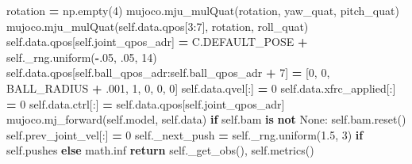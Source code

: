 \documentclass[
  american,
  11pt,
  letterpaper,
]{article}
\newenvironment{Shaded}{\begin{snugshade}}{\end{snugshade}}
\newcommand{\ControlFlowTok}[1]{\textcolor[rgb]{0.13,0.29,0.53}{\textbf{#1}}}
\newcommand{\DecValTok}[1]{\textcolor[rgb]{0.00,0.00,0.81}{#1}}
\newcommand{\FloatTok}[1]{\textcolor[rgb]{0.00,0.00,0.81}{#1}}
\newcommand{\KeywordTok}[1]{\textcolor[rgb]{0.13,0.29,0.53}{\textbf{#1}}}
\newcommand{\NormalTok}[1]{#1}
\newcommand{\OperatorTok}[1]{\textcolor[rgb]{0.81,0.36,0.00}{\textbf{#1}}}
\newcommand{\VariableTok}[1]{\textcolor[rgb]{0.00,0.00,0.00}{#1}}
\renewenvironment{Shaded}{\par\smallskip}{\par\smallskip}
\begin{document}
\begin{Shaded}
\begin{Highlighting}[]
\NormalTok{        rotation }\OperatorTok{=}\NormalTok{ np.empty(}\DecValTok{4}\NormalTok{)}
\NormalTok{        mujoco.mju\_mulQuat(rotation, yaw\_quat, pitch\_quat)}
\NormalTok{        mujoco.mju\_mulQuat(}\VariableTok{self}\NormalTok{.data.qpos[}\DecValTok{3}\NormalTok{:}\DecValTok{7}\NormalTok{], rotation, roll\_quat)}
        \VariableTok{self}\NormalTok{.data.qpos[}\VariableTok{self}\NormalTok{.joint\_qpos\_adr] }\OperatorTok{=}\NormalTok{ C.DEFAULT\_POSE }\OperatorTok{+} \VariableTok{self}\NormalTok{.\_rng.uniform(}\OperatorTok{{-}}\FloatTok{.05}\NormalTok{, }\FloatTok{.05}\NormalTok{, }\DecValTok{14}\NormalTok{)}
        \VariableTok{self}\NormalTok{.data.qpos[}\VariableTok{self}\NormalTok{.ball\_qpos\_adr:}\VariableTok{self}\NormalTok{.ball\_qpos\_adr }\OperatorTok{+} \DecValTok{7}\NormalTok{] }\OperatorTok{=}\NormalTok{ [}\DecValTok{0}\NormalTok{, }\DecValTok{0}\NormalTok{, BALL\_RADIUS }\OperatorTok{+} \FloatTok{.001}\NormalTok{, }\DecValTok{1}\NormalTok{, }\DecValTok{0}\NormalTok{, }\DecValTok{0}\NormalTok{, }\DecValTok{0}\NormalTok{]}
        \VariableTok{self}\NormalTok{.data.qvel[:] }\OperatorTok{=} \DecValTok{0}
        \VariableTok{self}\NormalTok{.data.xfrc\_applied[:] }\OperatorTok{=} \DecValTok{0}
        \VariableTok{self}\NormalTok{.data.ctrl[:] }\OperatorTok{=} \VariableTok{self}\NormalTok{.data.qpos[}\VariableTok{self}\NormalTok{.joint\_qpos\_adr]}
\NormalTok{        mujoco.mj\_forward(}\VariableTok{self}\NormalTok{.model, }\VariableTok{self}\NormalTok{.data)}
        \ControlFlowTok{if} \VariableTok{self}\NormalTok{.bam }\KeywordTok{is} \KeywordTok{not} \VariableTok{None}\NormalTok{:}
            \VariableTok{self}\NormalTok{.bam.reset()}
        \VariableTok{self}\NormalTok{.prev\_joint\_vel[:] }\OperatorTok{=} \DecValTok{0}
        \VariableTok{self}\NormalTok{.\_next\_push }\OperatorTok{=} \VariableTok{self}\NormalTok{.\_rng.uniform(}\FloatTok{1.5}\NormalTok{, }\DecValTok{3}\NormalTok{) }\ControlFlowTok{if} \VariableTok{self}\NormalTok{.pushes }\ControlFlowTok{else}\NormalTok{ math.inf}
        \ControlFlowTok{return} \VariableTok{self}\NormalTok{.\_get\_obs(), }\VariableTok{self}\NormalTok{.metrics()}


\end{Highlighting}
\end{Shaded}
\end{document}
